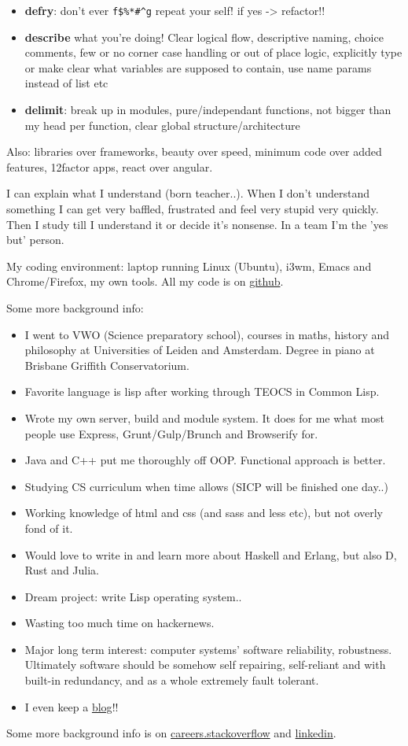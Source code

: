 \documentclass[11pt,a4paper,sans]{moderncv}        %
\begin{document}
\begin{itemize}
\item \textbf{defry}: don't ever \verb~f$%*#^g~ repeat your self!
if yes -> refactor!!
\item \textbf{describe} what you're doing!
Clear logical flow, descriptive naming, choice comments, few or no corner case handling or out of place logic, explicitly type or make clear what variables are supposed to contain, use name params instead of list etc
\item \textbf{delimit}: break up in modules, pure/independant functions, not bigger than my head per function, clear global structure/architecture
\end{itemize}

Also: libraries over frameworks, beauty over speed, minimum code over added features, 12factor apps, react over angular.

I can explain what I understand (born teacher..). When I don't understand something I can get very baffled, frustrated and feel very stupid very quickly. Then I study till I understand it or decide it's nonsense. In a team I'm the 'yes but' person. 

My coding environment: laptop running Linux (Ubuntu), i3wm, Emacs and Chrome/Firefox, my own tools. All my code is on \href{http://github.com/michieljoris}{github}.

Some more background info:

\begin{itemize}
\item I went to VWO (Science preparatory school), courses in maths, history and philosophy at Universities of Leiden and Amsterdam. Degree in piano at Brisbane Griffith Conservatorium.
\item Favorite language is lisp after working through TEOCS in Common Lisp.
\item Wrote my own server, build and module system. It does for me what most people use Express, Grunt/Gulp/Brunch and Browserify for.
\item Java and C++ put me thoroughly off OOP. Functional approach is better.
\item Studying CS curriculum when time allows (SICP will be finished one day..)
\item Working knowledge of html and css (and sass and less etc), but not overly fond of it.
\item Would love to write in and learn more about Haskell and Erlang, but also D, Rust and Julia.
\item Dream project: write Lisp operating system..
\item Wasting too much time on hackernews.
\item Major long term interest: computer systems' software reliability, robustness. Ultimately
software should be somehow self repairing, self-reliant and with built-in
redundancy, and as a whole extremely fault tolerant.
\item I even keep a \href{http://www.axion5.net}{blog}!!
\end{itemize}

Some more background info is on \href{http://careers.stackoverflow.com/michieljoris}{careers.stackoverflow} and \href{http://nl.linkedin.com/in/michieljoris/}{linkedin}.

\makeletterclosing
\end{document}
